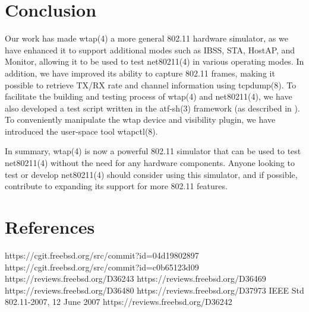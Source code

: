 \documentclass[conference]{IEEEtran}
\begin{document}
\section{Conclusion}
Our work has made wtap(4) a more general 802.11 hardware simulator, as we have enhanced it to support additional modes such as IBSS, STA, HostAP, and Monitor, allowing it to be used to test net80211(4) in various operating modes. In addition, we have improved its ability to capture 802.11 frames, making it possible to retrieve TX/RX rate and channel information using tcpdump(8). To facilitate the building and testing process of wtap(4) and net80211(4), we have also developed a test script written in the atf-sh(3) framework (as described in \cite{commit:atf}). To conveniently manipulate the wtap device and visibility plugin, we have introduced the user-space tool wtapctl(8).

In summary, wtap(4) is now a powerful 802.11 simulator that can be used to test net80211(4) without the need for any hardware components. Anyone looking to test or develop net80211(4) should consider using this simulator, and if possible, contribute to expanding its support for more 802.11 features.


\section{References}
\begin{thebibliography}{00}
 https://cgit.freebsd.org/src/commit?id=04d19802897
 https://cgit.freebsd.org/src/commit?id=c0b65123d09
 https://reviews.freebsd.org/D36243
 https://reviews.freebsd.org/D36469
 https://reviews.freebsd.org/D36480
 https://reviews.freebsd.org/D37973
 IEEE Std 802.11-2007, 12 June 2007
 https://reviews.freebsd.org/D36242
\end{thebibliography}
\vspace{12pt}
\end{document}
